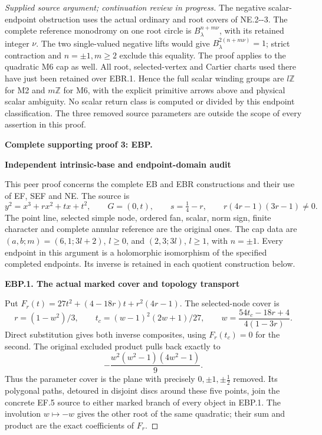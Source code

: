\begin{proof}[Supplied source argument; continuation review in progress]
The negative scalar-endpoint obstruction uses the actual
ordinary and root covers of NE.2-\/-3. The complete reference
monodromy on one root circle is \(B_\lambda^{n+m\nu}\),
with its retained integer \(\nu\). The two single-valued
negative lifts would give
\(B_\lambda^{2(n+m\nu)}=1\); strict contraction and
\(n=\pm1,m\ge2\) exclude this equality. The proof applies
to the quadratic M6 cap as well. All root, selected-vertex
and Cartier charts used there have just been retained over
EBR.1. Hence the full scalar winding groups are
\(l\mathbb Z\) for M2 and \(m\mathbb Z\) for M6, with the
explicit primitive arrows above and physical scalar ambiguity.
No scalar return class is computed or divided by this endpoint
classification. The three removed source parameters are outside
the scope of every assertion in this proof.



\par\bigskip\noindent\textbf{Complete supporting proof 3: EBP.}\par


\par

\medskip\noindent\textbf{Independent intrinsic-base and endpoint-domain audit}

\par\nobreak

This peer proof concerns the complete EB and EBR constructions and their
use of EF, SEF and NE. The source is
\[
 y^2=x^3+rx^2+tx+t^2,\qquad G=(0,t),\qquad
 s=\tfrac14-r,\qquad r(4r-1)(3r-1)\ne0.
 \tag{EBP.1}
\]
The point line, selected simple node, ordered fan, scalar, norm sign,
finite character and complete annular reference are the original ones.
The cap data are \((a,b;m)=(6,1;3l+2)\), \(l\ge0\), and
\((2,3;3l)\), \(l\ge1\), with \(n=\pm1\). Every endpoint in
this argument is a holomorphic isomorphism of the specified completed
endpoints. Its inverse is retained in each quotient construction below.

\par

\medskip\noindent\textbf{EBP.1. The actual marked cover and topology transport}

\par\nobreak

Put \(F_r(t)=27t^2+(4-18r)t+r^2(4r-1)\). The selected-node cover is
\[
 r=(1-w^2)/3,\qquad t_c=(w-1)^2(2w+1)/27,
 \qquad
 w=\frac{54t_c-18r+4}{4(1-3r)}.
 \tag{EBP.2}
\]
Direct substitution gives both inverse composites, using \(F_r(t_c)=0\)
for the second. The original excluded product pulls back exactly to
\[
 -\frac{w^2(w^2-1)(4w^2-1)}9.
 \tag{EBP.3}
\]
Thus the parameter cover is the plane with precisely
\(0,\pm1,\pm\tfrac12\) removed. Its polygonal paths, detoured in
disjoint discs around these five points, join the concrete EF.5 source
to either marked branch of every object in EBP.1. The involution
\(w\mapsto-w\) gives the other root of the same quadratic; their sum
and product are the exact coefficients of \(F_r\).


\end{proof}

